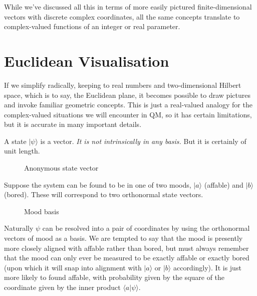 While we've discussed all this in terms of more easily pictured finite-dimensional vectors with discrete complex coordinates, all the same concepts translate to complex-valued functions of an integer or real parameter.

\section{Euclidean Visualisation}

If we simplify radically, keeping to real numbers and two-dimensional Hilbert space, which is to say, the Euclidean plane, it becomes possible to draw pictures and invoke familiar geometric concepts. This is just a real-valued analogy for the complex-valued situations we will encounter in QM, so it has certain limitations, but it is accurate in many important details.

A state $|\psi\rangle$ is a vector. \textit{It is not intrinsically in any basis.} But it is certainly of unit length.

\begin{figure}[h]
  \centering
  \centering
  \caption{Anonymous state vector} \label{fig:state-vector}
\end{figure}

Suppose the system can be found to be in one of two moods, $|a\rangle$ (affable) and $|b\rangle$ (bored). These will correspond to two orthonormal state vectors.

\begin{figure}[h]
  \centering
  \centering
  \caption{Mood basis} \label{fig:mood-basis}
\end{figure}

Naturally $\psi$ can be resolved into a pair of coordinates by using the orthonormal vectors of mood as a basis. We are tempted to say that the mood is presently more closely aligned with affable rather than bored, but must always remember that the mood can only ever be measured to be exactly affable or exactly bored (upon which it will snap into alignment with $|a\rangle$ or $|b\rangle$ accordingly). It is just more likely to found affable, with probability given by the square of the coordinate given by the inner product $\langle a|\psi \rangle$.

